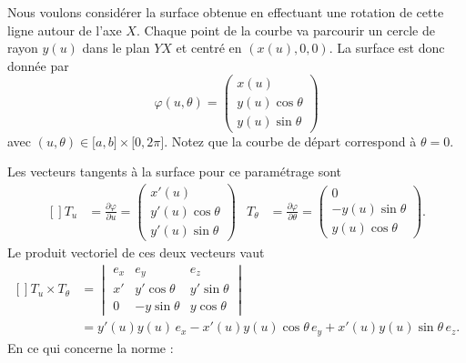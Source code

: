 Nous voulons considérer la surface obtenue en effectuant une rotation de cette ligne autour de l'axe $X$. Chaque point de la courbe va parcourir un cercle de rayon $y(u)$ dans le plan $YX$ et centré en $(x(u),0,0)$. La surface est donc donnée par
\begin{equation}
    \varphi(u,\theta)=\begin{pmatrix}
        x(u)    \\
        y(u)\cos\theta    \\
        y(u)\sin\theta
    \end{pmatrix}
\end{equation}
avec $(u,\theta)\in\mathopen[ a , b \mathclose]\times \mathopen[ 0 , 2\pi \mathclose]$. Notez que la courbe de départ correspond à $\theta=0$.

Les vecteurs tangents à la surface pour ce paramétrage sont
\begin{equation}
    \begin{aligned}[]
        T_u&=\frac{ \partial \varphi }{ \partial u }=\begin{pmatrix}
            x'(u)    \\
            y'(u)\cos\theta    \\
            y'(u)\sin\theta
        \end{pmatrix}&
        T_{\theta}&=\frac{ \partial \varphi }{ \partial \theta }=\begin{pmatrix}
            0    \\
            -y(u)\sin\theta    \\
            y(u)\cos\theta
        \end{pmatrix}.
    \end{aligned}
\end{equation}
Le produit vectoriel de ces deux vecteurs vaut
\begin{equation}
    \begin{aligned}[]
        T_u\times T_{\theta}&=\begin{vmatrix}
            e_x    &   e_y    &   e_z    \\
            x'    &   y'\cos\theta    &   y'\sin\theta    \\
            0    &   -y\sin\theta    &   y\cos\theta
        \end{vmatrix}\\
        &=y'(u)y(u)\,e_x-x'(u)y(u)\cos\theta\, e_y+x'(u)y(u)\sin\theta\, e_z.
    \end{aligned}
\end{equation}
En ce qui concerne la norme :
